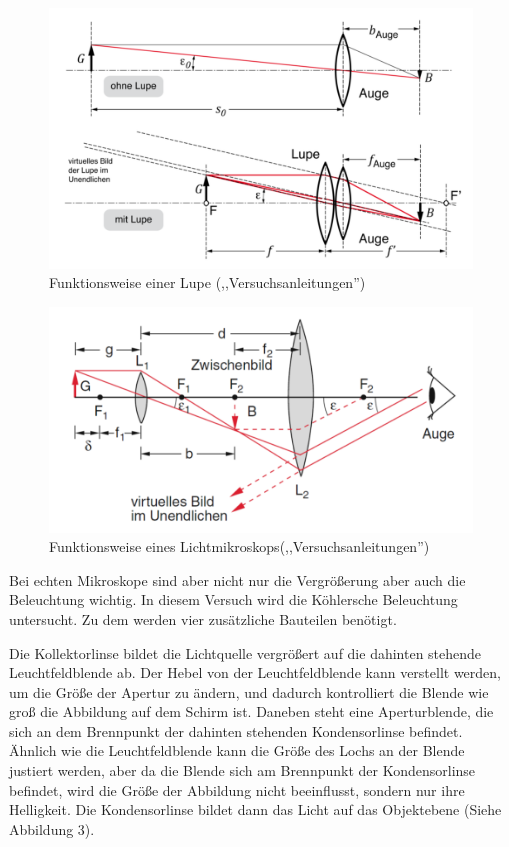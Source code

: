\documentclass[11pt,a4paper]{article}
\begin{document}
\begin{figure}
	\centering
	\includegraphics[width=\linewidth]{Abb1}
	\caption{Funktionsweise einer Lupe (,,Versuchsanleitungen'')}
\end{figure}

\begin{figure}
	\centering
	\includegraphics[width=\linewidth]{Abb2}
	\caption{Funktionsweise eines Lichtmikroskops(,,Versuchsanleitungen'')}
\end{figure}

Bei echten Mikroskope sind aber nicht nur die Vergrößerung aber auch die Beleuchtung wichtig. In diesem Versuch wird die Köhlersche Beleuchtung untersucht. Zu dem werden vier zusätzliche Bauteilen benötigt. 

Die Kollektorlinse bildet die Lichtquelle vergrößert auf die dahinten stehende Leuchtfeldblende ab. Der Hebel von der Leuchtfeldblende kann verstellt werden, um die Größe der Apertur zu ändern,  und dadurch kontrolliert die Blende wie groß die Abbildung auf dem Schirm ist. Daneben steht eine Aperturblende, die sich an dem Brennpunkt der dahinten stehenden Kondensorlinse befindet. Ähnlich wie die Leuchtfeldblende kann die Größe des Lochs an der Blende justiert werden, aber da die Blende sich am Brennpunkt der Kondensorlinse befindet, wird die Größe der Abbildung nicht beeinflusst, sondern nur ihre Helligkeit. Die Kondensorlinse bildet dann das Licht auf das Objektebene (Siehe Abbildung 3).
\end{document}
